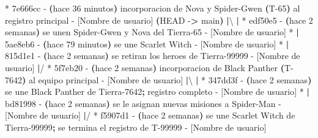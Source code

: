 \documentclass[
]{book}
\newenvironment{Shaded}{\begin{snugshade}}{\end{snugshade}}
\newcommand{\AttributeTok}[1]{\textcolor[rgb]{0.13,0.29,0.53}{#1}}
\newcommand{\ErrorTok}[1]{\textcolor[rgb]{0.64,0.00,0.00}{\textbf{#1}}}
\newcommand{\ExtensionTok}[1]{#1}
\newcommand{\KeywordTok}[1]{\textcolor[rgb]{0.13,0.29,0.53}{\textbf{#1}}}
\newcommand{\NormalTok}[1]{#1}
\newcommand{\OperatorTok}[1]{\textcolor[rgb]{0.81,0.36,0.00}{\textbf{#1}}}
\begin{document}
\begin{Shaded}
\begin{Highlighting}[]
\ExtensionTok{*}\NormalTok{   7e666cc }\AttributeTok{{-}} \ErrorTok{(}\ExtensionTok{hace}\NormalTok{ 36 minutos}\KeywordTok{)} \ExtensionTok{incorporacion}\NormalTok{ de Nova y Spider{-}Gwen }\ErrorTok{(}\ExtensionTok{T{-}65}\KeywordTok{)} \ExtensionTok{al}\NormalTok{ registro principal }\AttributeTok{{-}}\NormalTok{ [Nombre de usuario] }\ErrorTok{(}\ExtensionTok{HEAD} \AttributeTok{{-}}\OperatorTok{\textgreater{}}\NormalTok{ main}\KeywordTok{)}
\KeywordTok{|}\ExtensionTok{\textbackslash{} } 
\KeywordTok{|} \ExtensionTok{*}\NormalTok{ edf50e5 }\AttributeTok{{-}} \ErrorTok{(}\ExtensionTok{hace}\NormalTok{ 2 semanas}\KeywordTok{)} \ExtensionTok{se}\NormalTok{ unen Spider{-}Gwen y Nova del Tierra{-}65 }\AttributeTok{{-}}\NormalTok{ [Nombre de usuario]}
\ExtensionTok{*} \KeywordTok{|} \ExtensionTok{5ae8eb6} \AttributeTok{{-}} \ErrorTok{(}\ExtensionTok{hace}\NormalTok{ 79 minutos}\KeywordTok{)} \ExtensionTok{se}\NormalTok{ une Scarlet Witch }\AttributeTok{{-}}\NormalTok{ [Nombre de usuario]}
\ExtensionTok{*} \KeywordTok{|} \ExtensionTok{815d1e1} \AttributeTok{{-}} \ErrorTok{(}\ExtensionTok{hace}\NormalTok{ 2 semanas}\KeywordTok{)} \ExtensionTok{se}\NormalTok{ retiran los heroes de Tierra{-}99999 }\AttributeTok{{-}}\NormalTok{ [Nombre de usuario]}
\KeywordTok{|}\ExtensionTok{/}  
\ExtensionTok{*}\NormalTok{   5f7eb20 }\AttributeTok{{-}} \ErrorTok{(}\ExtensionTok{hace}\NormalTok{ 2 semanas}\KeywordTok{)} \ExtensionTok{incorporacion}\NormalTok{ de Black Panther }\ErrorTok{(}\ExtensionTok{T{-}7642}\KeywordTok{)} \ExtensionTok{al}\NormalTok{ equipo principal }\AttributeTok{{-}}\NormalTok{ [Nombre de usuario]}
\KeywordTok{|}\ExtensionTok{\textbackslash{} } 
\KeywordTok{|} \ExtensionTok{*}\NormalTok{ 347dd3f }\AttributeTok{{-}} \ErrorTok{(}\ExtensionTok{hace}\NormalTok{ 2 semanas}\KeywordTok{)} \ExtensionTok{se}\NormalTok{ une Black Panther de Tierra{-}7642}\KeywordTok{;} \ExtensionTok{registro}\NormalTok{ completo }\AttributeTok{{-}}\NormalTok{ [Nombre de usuario]}
\ExtensionTok{*} \KeywordTok{|} \ExtensionTok{bd81998} \AttributeTok{{-}} \ErrorTok{(}\ExtensionTok{hace}\NormalTok{ 2 semanas}\KeywordTok{)} \ExtensionTok{se}\NormalTok{ le asignan nuevas misiones a Spider{-}Man }\AttributeTok{{-}}\NormalTok{ [Nombre de usuario]}
\KeywordTok{|}\ExtensionTok{/}  
\ExtensionTok{*}\NormalTok{ f5907d1 }\AttributeTok{{-}} \ErrorTok{(}\ExtensionTok{hace}\NormalTok{ 2 semanas}\KeywordTok{)} \ExtensionTok{se}\NormalTok{ une Scarlet Witch de Tierra{-}99999}\KeywordTok{;} \ExtensionTok{se}\NormalTok{ termina el registro de T{-}99999 }\AttributeTok{{-}}\NormalTok{ [Nombre de usuario]}

\end{Highlighting}
\end{Shaded}
\end{document}
